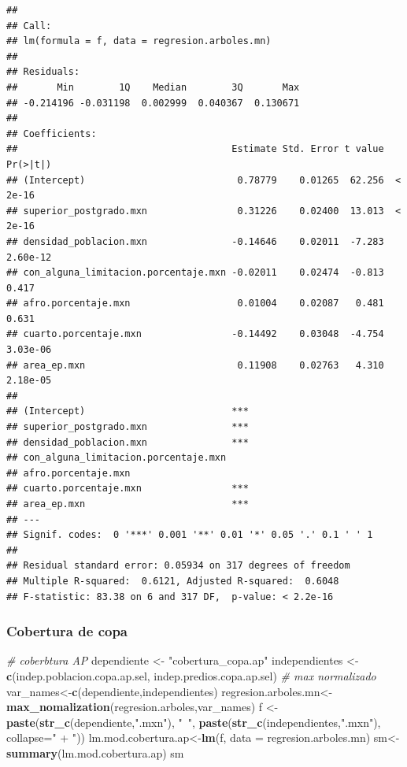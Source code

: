 \documentclass[12pt,]{book}
\newenvironment{Shaded}{\begin{snugshade}}{\end{snugshade}}
\newcommand{\KeywordTok}[1]{\textcolor[rgb]{0.13,0.29,0.53}{\textbf{#1}}}
\newcommand{\DataTypeTok}[1]{\textcolor[rgb]{0.13,0.29,0.53}{#1}}
\newcommand{\StringTok}[1]{\textcolor[rgb]{0.31,0.60,0.02}{#1}}
\newcommand{\CommentTok}[1]{\textcolor[rgb]{0.56,0.35,0.01}{\textit{#1}}}
\newcommand{\NormalTok}[1]{#1}
\begin{document}
\begin{verbatim}
## 
## Call:
## lm(formula = f, data = regresion.arboles.mn)
## 
## Residuals:
##       Min        1Q    Median        3Q       Max 
## -0.214196 -0.031198  0.002999  0.040367  0.130671 
## 
## Coefficients:
##                                      Estimate Std. Error t value Pr(>|t|)
## (Intercept)                           0.78779    0.01265  62.256  < 2e-16
## superior_postgrado.mxn                0.31226    0.02400  13.013  < 2e-16
## densidad_poblacion.mxn               -0.14646    0.02011  -7.283 2.60e-12
## con_alguna_limitacion.porcentaje.mxn -0.02011    0.02474  -0.813    0.417
## afro.porcentaje.mxn                   0.01004    0.02087   0.481    0.631
## cuarto.porcentaje.mxn                -0.14492    0.03048  -4.754 3.03e-06
## area_ep.mxn                           0.11908    0.02763   4.310 2.18e-05
##                                         
## (Intercept)                          ***
## superior_postgrado.mxn               ***
## densidad_poblacion.mxn               ***
## con_alguna_limitacion.porcentaje.mxn    
## afro.porcentaje.mxn                     
## cuarto.porcentaje.mxn                ***
## area_ep.mxn                          ***
## ---
## Signif. codes:  0 '***' 0.001 '**' 0.01 '*' 0.05 '.' 0.1 ' ' 1
## 
## Residual standard error: 0.05934 on 317 degrees of freedom
## Multiple R-squared:  0.6121, Adjusted R-squared:  0.6048 
## F-statistic: 83.38 on 6 and 317 DF,  p-value: < 2.2e-16
\end{verbatim}

\subsubsection{Cobertura de copa}\label{cobertura-de-copa}

\begin{Shaded}
\begin{Highlighting}[]
\CommentTok{# coberbtura AP}
\NormalTok{dependiente <-}\StringTok{ "cobertura_copa.ap"}
\NormalTok{independientes  <-}\StringTok{ }\KeywordTok{c}\NormalTok{(indep.poblacion.copa.ap.sel,}
\NormalTok{                     indep.predios.copa.ap.sel)}
\CommentTok{# max normalizado }
\NormalTok{var_names<-}\KeywordTok{c}\NormalTok{(dependiente,independientes)}
\NormalTok{regresion.arboles.mn<-}\KeywordTok{max_nomalization}\NormalTok{(regresion.arboles,var_names)}
\NormalTok{f <-}\StringTok{ }\KeywordTok{paste}\NormalTok{(}\KeywordTok{str_c}\NormalTok{(dependiente,}\StringTok{".mxn"}\NormalTok{),}
           \StringTok{"~"}\NormalTok{, }\KeywordTok{paste}\NormalTok{(}\KeywordTok{str_c}\NormalTok{(independientes,}\StringTok{".mxn"}\NormalTok{), }
                      \DataTypeTok{collapse=}\StringTok{" + "}\NormalTok{))}
\NormalTok{lm.mod.cobertura.ap<-}\KeywordTok{lm}\NormalTok{(f, }
                        \DataTypeTok{data =}\NormalTok{ regresion.arboles.mn)}
\NormalTok{sm<-}\KeywordTok{summary}\NormalTok{(lm.mod.cobertura.ap)}
\NormalTok{sm}
\end{Highlighting}
\end{Shaded}
\end{document}
